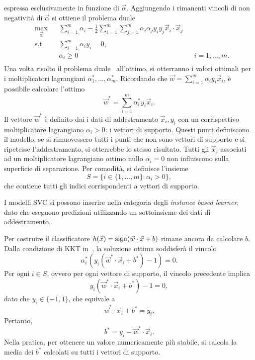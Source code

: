 espressa esclusivamente in funzione di $\Vec{\alpha}$.
Aggiungendo i rimanenti vincoli di non negatività di $\vec{\alpha}$ si ottiene il problema duale
\begin{equation}\label{eq:svc:hardmargin:wolfe_dual}
\begin{aligned}
& \max_{\vec\alpha}     && \sum_{i=1}^{m}\alpha_i - \frac{1}{2}\sum_{i=1}^{m}\sum_{j=1}^{m}\alpha_i\alpha_jy_iy_j\Vec{x}_i\cdot\Vec{x}_j\\
& \textrm{s.t.}     && \sum_{i=1}^{m} \alpha_iy_i = 0, \\
&                   && \alpha_i \geq 0 && i=1,\dots,m. \\
\end{aligned}
\end{equation}
%
Una volta risolto il problema duale~ all'ottimo, si otterranno i valori ottimali per i moltiplicatori lagrangiani $\alpha_1^*, ..., \alpha_m^*$.
Ricordando che $\Vec{w} = \sum_{i=1}^{m}\alpha_iy_i\Vec{x}_i$, è possibile calcolare l'ottimo 
\begin{equation}\label{eq:representer_w} %
\Vec{w}^* = \sum_{i=1}^{m}\alpha_i^*y_i\Vec{x}_i.
\end{equation}
Il vettore $\Vec{w}^*$ è definito dai i dati di addestramento $\Vec{x}_i, y_i$ con un corrispettivo moltiplicatore lagrangiano $\alpha_i > 0$: i vettori di supporto. 
Questi punti definiscono il modello: se si rimuovessero tutti i punti che non sono vettori di supporto e si ripetesse l'addestramento, si otterrebbe lo stesso risultato.
Tutti gli $\Vec{x}_i$ associati ad un moltiplicatore lagrangiano ottimo nullo $\alpha_i=0$ non influiscono sulla superficie di separazione.
Per comodità, si definisce l'insieme
\begin{equation*}
    S = \{i \in \{1,\dots,m\} :\alpha_i >0\},   
\end{equation*}
che contiene tutti gli indici corrispondenti a vettori di supporto.

I modelli SVC si possono inserire nella categoria degli \emph{instance based learner}, dato che eseguono predizioni utilizzando un sottoinsieme dei dati di addestramento.

Per costruire il classificatore $h(\Vec{x}) = \mathrm{sign}(\Vec{w}\cdot \Vec{x} +b)$ rimane ancora da calcolare $b$.  Dalla condizione di KKT in~, la soluzione ottima soddisferà il vincolo 
\begin{equation*}
\alpha_i^*(y_i(\Vec{w}^*\cdot\Vec{x}_i+b^*)-1)=0.
\end{equation*}
Per ogni $i \in S$, ovvero per ogni vettore di supporto, il vincolo precedente implica  
\begin{equation*}
y_i(\Vec{w}^*\cdot\Vec{x}_i+b^*) -1 = 0,
\end{equation*}
dato che $y_i \in \{-1,1\}$, che equivale a
\begin{equation*}
\Vec{w}^*\cdot\Vec{x}_i+b^*=y_i.
\end{equation*}
Pertanto,
\begin{equation*}
b^*=y_i - \Vec{w}^*\cdot\Vec{x}_i.
\end{equation*} 
Nella pratica, per ottenere un valore numericamente più stabile, si calcola la media dei $b^*$ calcolati su tutti i vettori di supporto.

